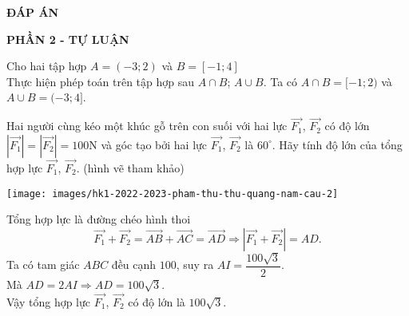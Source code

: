 \begin{center}
	\textbf{ĐÁP ÁN}
\end{center}
\begin{center}
	\textbf{PHẦN 2 - TỰ LUẬN}
\end{center}

\begin{bt}%
Cho hai tập hợp $A=(-3;2)$ và $B=[-1;4]$\\
Thực hiện phép toán trên tập hợp sau $A\cap B$; $A\cup B$.
\loigiai
{
Ta có $A\cap B=[-1;2)$ và $A \cup B=(-3;4]$.
}
\end{bt}

\begin{bt}%
Hai người cùng kéo một khúc gỗ trên con suối với hai lực $\overrightarrow{F_1}$, $\overrightarrow{F_2}$ có độ lớn $\left|\overrightarrow{F_1}\right|=\left|\overrightarrow{F_2}\right|=100$N và góc tạo bởi hai lực $\overrightarrow{F_1}$, $\overrightarrow{F_2}$ là $60^\circ$. Hãy tính độ lớn của tổng hợp lực $\overrightarrow{F_1}$, $\overrightarrow{F_2}$. (hình vẽ tham khảo)
\begin{center}
\texttt{[image: images/hk1-2022-2023-pham-thu-thu-quang-nam-cau-2]}
\end{center}
\loigiai
{
\immini
{
Tổng hợp lực là đường chéo hình thoi
$$\overrightarrow{F_1}+\overrightarrow{F_2}=\overrightarrow{AB}+\overrightarrow{AC}=\overrightarrow{AD} \Rightarrow \left|\overrightarrow{F_1}+\overrightarrow{F_2}\right|=AD.$$
Ta có tam giác $ABC$ đều cạnh $100$, suy ra $AI=\dfrac{100\sqrt{3}}{2}$. \\
Mà $AD=2AI \Rightarrow AD=100\sqrt{3}$. \\
Vậy tổng hợp lực $\overrightarrow{F_1}$, $\overrightarrow{F_2}$ có độ lớn là $100\sqrt{3}$.
}
{
}
}
\end{bt}


